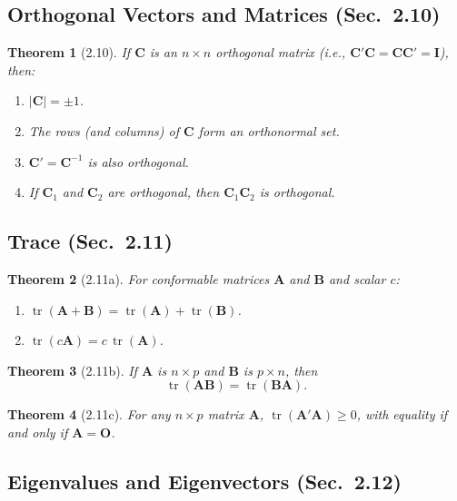 \documentclass{article}
\newtheorem{theorem}{Theorem}[section]
\begin{document}
\subsection{Orthogonal Vectors and Matrices (Sec.\ 2.10)}

\begin{theorem}[2.10]
If $\mathbf{C}$ is an $n \times n$ orthogonal matrix (i.e., $\mathbf{C}'\mathbf{C} = \mathbf{C}\mathbf{C}' = \mathbf{I}$), then:
\begin{enumerate}[label=(\roman*)]
\item $|\mathbf{C}| = \pm 1$.
\item The rows (and columns) of $\mathbf{C}$ form an orthonormal set.
\item $\mathbf{C}' = \mathbf{C}^{-1}$ is also orthogonal.
\item If $\mathbf{C}_1$ and $\mathbf{C}_2$ are orthogonal, then $\mathbf{C}_1\mathbf{C}_2$ is orthogonal.
\end{enumerate}
\end{theorem}

\subsection{Trace (Sec.\ 2.11)}

\begin{theorem}[2.11a]
For conformable matrices $\mathbf{A}$ and $\mathbf{B}$ and scalar $c$:
\begin{enumerate}[label=(\roman*)]
\item $\operatorname{tr}(\mathbf{A} + \mathbf{B}) = \operatorname{tr}(\mathbf{A}) + \operatorname{tr}(\mathbf{B})$.
\item $\operatorname{tr}(c\mathbf{A}) = c\,\operatorname{tr}(\mathbf{A})$.
\end{enumerate}
\end{theorem}

\begin{theorem}[2.11b]
If $\mathbf{A}$ is $n \times p$ and $\mathbf{B}$ is $p \times n$, then
\[
\operatorname{tr}(\mathbf{A}\mathbf{B}) = \operatorname{tr}(\mathbf{B}\mathbf{A}).
\]
\end{theorem}

\begin{theorem}[2.11c]
For any $n \times p$ matrix $\mathbf{A}$, $\operatorname{tr}(\mathbf{A}'\mathbf{A}) \geq 0$, with equality if and only if $\mathbf{A} = \mathbf{O}$.
\end{theorem}

\subsection{Eigenvalues and Eigenvectors (Sec.\ 2.12)}
\end{document}
